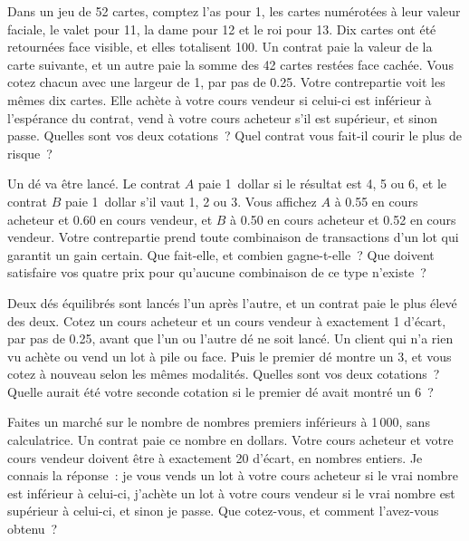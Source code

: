 \begin{question}\label{iq:iv2:making-a-market:4}
Dans un jeu de 52 cartes, comptez l'as pour 1, les cartes numérotées à leur valeur faciale, le valet pour 11, la dame pour 12 et le roi pour 13. Dix cartes ont été retournées face visible, et elles totalisent 100. Un contrat paie la valeur de la carte suivante, et un autre paie la somme des 42 cartes restées face cachée. Vous cotez chacun avec une largeur de 1, par pas de 0.25. Votre contrepartie voit les mêmes dix cartes. Elle achète à votre cours vendeur si celui-ci est inférieur à l'espérance du contrat, vend à votre cours acheteur s'il est supérieur, et sinon passe. Quelles sont vos deux cotations~? Quel contrat vous fait-il courir le plus de risque~?
\end{question}

\begin{question}\label{iq:iv2:making-a-market:5}
Un dé va être lancé. Le contrat $A$ paie 1~dollar si le résultat est 4, 5 ou 6, et le contrat $B$ paie 1~dollar s'il vaut 1, 2 ou 3. Vous affichez $A$ à 0.55 en cours acheteur et 0.60 en cours vendeur, et $B$ à 0.50 en cours acheteur et 0.52 en cours vendeur. Votre contrepartie prend toute combinaison de transactions d'un lot qui garantit un gain certain. Que fait-elle, et combien gagne-t-elle~? Que doivent satisfaire vos quatre prix pour qu'aucune combinaison de ce type n'existe~?
\end{question}

\begin{question}\label{iq:iv2:making-a-market:6}
Deux dés équilibrés sont lancés l'un après l'autre, et un contrat paie le plus élevé des deux. Cotez un cours acheteur et un cours vendeur à exactement 1 d'écart, par pas de 0.25, avant que l'un ou l'autre dé ne soit lancé. Un client qui n'a rien vu achète ou vend un lot à pile ou face. Puis le premier dé montre un 3, et vous cotez à nouveau selon les mêmes modalités. Quelles sont vos deux cotations~? Quelle aurait été votre seconde cotation si le premier dé avait montré un 6~?
\end{question}

\begin{question}\label{iq:iv2:making-a-market:7}
Faites un marché sur le nombre de nombres premiers inférieurs à 1\,000, sans calculatrice. Un contrat paie ce nombre en dollars. Votre cours acheteur et votre cours vendeur doivent être à exactement 20 d'écart, en nombres entiers. Je connais la réponse~: je vous vends un lot à votre cours acheteur si le vrai nombre est inférieur à celui-ci, j'achète un lot à votre cours vendeur si le vrai nombre est supérieur à celui-ci, et sinon je passe. Que cotez-vous, et comment l'avez-vous obtenu~?
\end{question}

